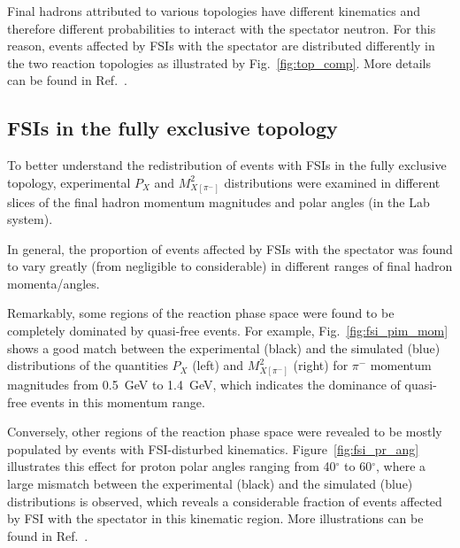 \documentclass[prc,twocolumn,superscriptaddress,showpacs,amssymb,amsmath,amsfonts,aps,nofootinbib]{revtex4-1}
\begin{document}
Final hadrons attributed to various topologies have different kinematics and therefore different probabilities to interact with the spectator neutron. For this reason, events affected by FSIs with the spectator are distributed differently in the two reaction topologies as illustrated by Fig.\!~\ref{fig:top_comp}. More details can be found in Ref.\!~\cite{my_thesis:2021}.



\subsection{FSIs in the fully exclusive topology}
\label{Sect:fsi_fully_excl}



To better understand the redistribution of events with FSIs in the fully exclusive topology, experimental $P_{X}$ and  $M^{2}_{X[\pi^{-}]}$ distributions were examined in different slices of the final hadron momentum magnitudes and polar angles (in the Lab system). 

In general, the proportion of events affected by FSIs with the spectator was found to vary greatly (from negligible to considerable) in different ranges of final hadron momenta/angles.  



Remarkably, some regions of the reaction phase space were found to be completely dominated by quasi-free events.  For example, Fig.\!~\ref{fig:fsi_pim_mom} shows a good match between the experimental (black) and the simulated (blue) distributions of the quantities $P_{X}$ (left) and $M^{2}_{X[\pi^{-}]}$ (right) for $\pi^{-}$ momentum magnitudes from 0.5~GeV to 1.4~GeV, which indicates the dominance of quasi-free events in this momentum range.

Conversely, other regions of the reaction phase space were revealed to be mostly populated by events with FSI-disturbed kinematics. Figure~\ref{fig:fsi_pr_ang} illustrates this effect for proton polar angles ranging from 40$^{\circ}$ to 60$^{\circ}$, where a large mismatch between the experimental (black) and the simulated (blue) distributions is observed, which reveals a considerable fraction of events affected by FSI with the spectator in this kinematic region. More illustrations can be found in Ref.\!~\cite{my_thesis:2021}.
\end{document}
